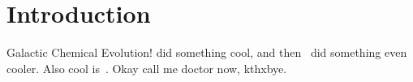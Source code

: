 
\chapter{Introduction}
\label{main:sec:intro}

Galactic Chemical Evolution!
\citet{Johnson2020} did something cool, and then~\citet{Johnson2021} did
something even cooler.
Also cool is~\citet{Johnson2022b}.
Okay call me doctor now, kthxbye.


